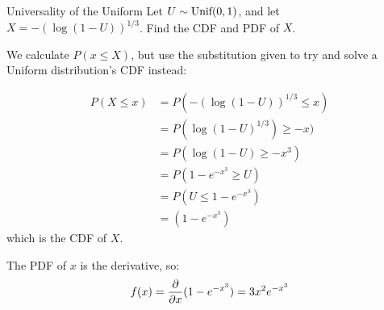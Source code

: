 \documentclass[11.5pt]{article}
\begin{document}
\begin{exercise}{Universality of the Uniform} 
 Let $U \sim \Unif(0,1)$, and let $X = -(\log(1-U))^{1/3}$. Find the CDF and PDF of $X$.
\end{exercise}

\begin{solution}{0.5} 
We calculate $P(x \leq X)$, but use the substitution given to try and solve a Uniform distribution's CDF instead: 

\begin{align*}
P(X \leq x) &= P(-(\log(1-U))^{1/3} \leq x)\\
 & = P(\log(1-U)^{1/3}) \geq -x) \\ 
&= P(\log(1-U) \geq -x^3)  \\ 
&= P(1 - e^{-x^3} \geq U) \\
&= P(U \leq 1 - e^{-x^3})\\
&= \boxed{(1 - e^{-x^3})}
\end{align*}
which is the CDF of $X$. 

The PDF of $x$ is the derivative, so: $$ f(x) = \pder[]{x} (1 - e^{-x^3}) = 3x^2 e^{-x^3}$$

\end{solution}

\end{document}
